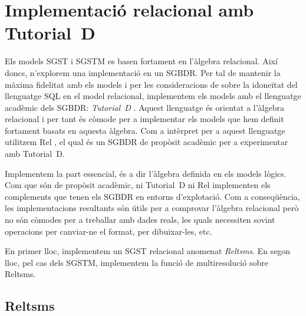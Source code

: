 \chapter{Implementació relacional amb Tutorial~D}

Els models \gls{SGST} i \gls{SGSTM} es basen fortament en l'àlgebra
relacional.  Així doncs, n'explorem una implementació en un
\gls{SGBDR}. Per tal de mantenir la màxima fidelitat amb els models i
per les consideracions de \textcite[cap.~1--4]{date04:introduction8}
sobre la idoneïtat del llenguatge \gls{SQL} en el model relacional,
implementem els models amb el llenguatge acadèmic dels \gls{SGBDR}:
\emph{Tutorial~D} \parencite{date04:introduction8,date:thethirdmanifesto,date:tutoriald}. Aquest
llenguatge és orientat a l'àlgebra relacional i per tant és còmode per
a implementar els models que hem definit fortament basats en aquesta
àlgebra.  Com a intèrpret per a aquest llenguatge utilitzem
Rel \parencite{rel}, el qual és un \gls{SGBDR} de propòsit acadèmic
per a experimentar amb Tutorial~D.





Implementem la part essencial, és a dir l'àlgebra definida en els
models lògics. Com que són de propòsit acadèmic, ni Tutorial~D ni Rel
implementen els complements que tenen els \gls{SGBDR} en entorns
d'explotació. Com a conseqüència, les implementacions resultants són
útils per a comprovar l'àlgebra relacional però no són còmodes per a
treballar amb dades reals, les quals necessiten sovint operacions
per canviar-ne el format, per dibuixar-les, etc.


En primer lloc, implementem un \gls{SGST} relacional anomenat
\emph{Reltsms}. En segon lloc, pel cas dels \gls{SGSTM}, implementem
la funció de multiresolució sobre Reltsms.



\section{Reltsms}


